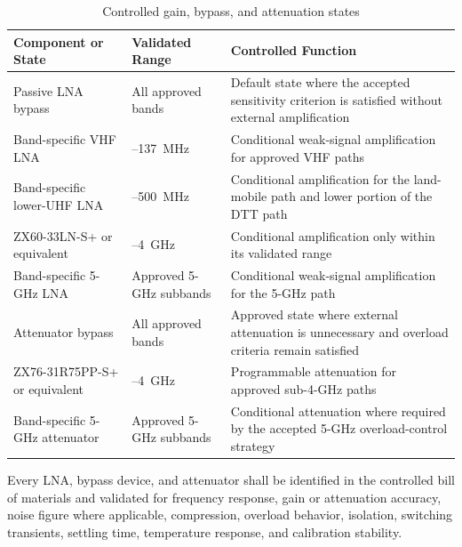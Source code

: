 \documentclass[11pt,a4paper]{article}
\begin{document}
	\begin{table}[htbp]
		\centering
		\small
		\renewcommand{\arraystretch}{1.2}
		\begin{tabularx}{\columnwidth}{
				>{\raggedright\arraybackslash}p{3.2cm}
				>{\raggedright\arraybackslash}p{2.8cm}
				>{\raggedright\arraybackslash}X}
			\toprule
			\textbf{Component or State} &
			\textbf{Validated Range} &
			\textbf{Controlled Function} \\
			\midrule
			
			Passive LNA bypass &
			All approved bands &
			Default state where the accepted sensitivity criterion is satisfied
			without external amplification \\
			
			Band-specific VHF LNA &
			88--137~MHz &
			Conditional weak-signal amplification for approved VHF paths \\
			
			Band-specific lower-UHF LNA &
			406--500~MHz &
			Conditional amplification for the land-mobile path and lower portion
			of the DTT path \\
			
			ZX60-33LN-S+ or equivalent &
			0.5--4~GHz &
			Conditional amplification only within its validated range \\
			
			Band-specific 5-GHz LNA &
			Approved 5-GHz subbands &
			Conditional weak-signal amplification for the 5-GHz path \\
			
			Attenuator bypass &
			All approved bands &
			Approved state where external attenuation is unnecessary and overload
			criteria remain satisfied \\
			
			ZX76-31R75PP-S+ or equivalent &
			0.1--4~GHz &
			Programmable attenuation for approved sub-4-GHz paths \\
			
			Band-specific 5-GHz attenuator &
			Approved 5-GHz subbands &
			Conditional attenuation where required by the accepted 5-GHz
			overload-control strategy \\
			
			\bottomrule
		\end{tabularx}
		\caption{Controlled gain, bypass, and attenuation states}
		\label{tab:lna}
	\end{table}
	
	Every LNA, bypass device, and attenuator shall be identified in the controlled
	bill of materials and validated for frequency response, gain or attenuation
	accuracy, noise figure where applicable, compression, overload behavior,
	isolation, switching transients, settling time, temperature response, and
	calibration stability.
	
\end{document}
